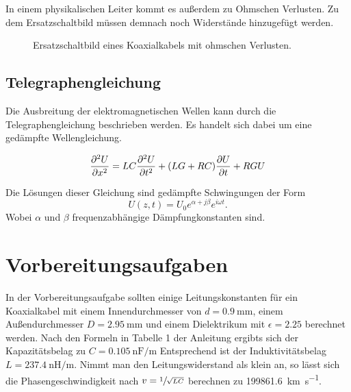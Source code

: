 In einem physikalischen Leiter kommt es außerdem zu Ohmschen Verlusten. Zu dem Ersatzschaltbild müssen demnach noch Widerstände hinzugefügt werden.
\begin{figure}
  \centering
  
  \caption{Ersatzschaltbild eines Koaxialkabels mit ohmschen Verlusten.}
  \label{fig:circuit_ohm}
\end{figure}


\subsection{Telegraphengleichung}
Die Ausbreitung der elektromagnetischen Wellen kann durch die Telegraphengleichung beschrieben werden.
Es handelt sich dabei um eine gedämpfte Wellengleichung.

\begin{equation}
  \label{eq:telegraph}
  \frac{\partial^2 U}{\partial x^2} = LC  \frac{\mathinner{\partial^2 U}}{\mathinner{\partial t^2} } + (LG + RC) \frac{\mathinner{\partial U}}{\mathinner{\partial t} } + RGU
\end{equation}

Die Lösungen dieser Gleichung sind gedämpfte Schwingungen der Form
\begin{equation}
  U(z, t) = U_0 e^{\alpha + j \beta} e^{i \omega t}.
\end{equation}
Wobei $\alpha$ und $\beta$ frequenzabhängige Dämpfungkonstanten sind.

\section{Vorbereitungsaufgaben}
In der Vorbereitungsaufgabe sollten einige Leitungskonstanten für ein Koaxialkabel mit einem Innendurchmesser von $d = \SI{0.9}{\mm}$,
einem Außendurchmesser $D = \SI{2.95}{\mm}$  und einem Dielektrikum mit $\epsilon = 2.25$ berechnet werden.
Nach den Formeln in Tabelle 1 der Anleitung\cite{anleitung} ergibts sich der Kapazitätsbelag zu $C = \SI{0.105}{\nano\farad \per \meter}$
Entsprechend ist der Induktivitätsbelag $ L = \SI{237.4}{\nano \henry \per \meter}$.
Nimmt man den Leitungswiderstand als klein an, so lässt sich die Phasengeschwindigkeit nach $v = \sfrac{1}{\sqrt{L C}}$ berechnen zu
\SI{199861.6}{\kilo\meter\per\second}.
